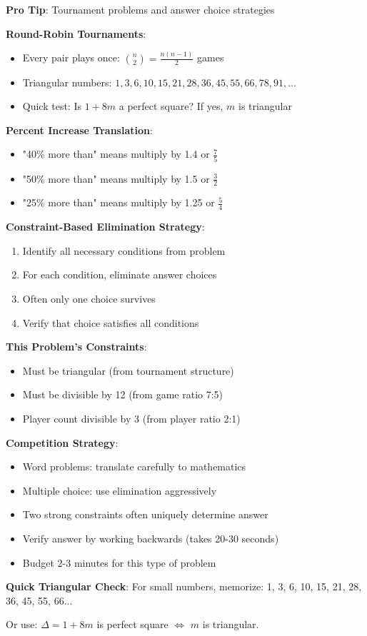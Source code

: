\documentclass[12pt]{article}
\begin{document}
\begin{tipbox}
\textbf{Pro Tip}: Tournament problems and answer choice strategies

\textbf{Round-Robin Tournaments}:
\begin{itemize}
    \item Every pair plays once: $\binom{n}{2} = \frac{n(n-1)}{2}$ games
    \item Triangular numbers: $1, 3, 6, 10, 15, 21, 28, 36, 45, 55, 66, 78, 91, \ldots$
    \item Quick test: Is $1+8m$ a perfect square? If yes, $m$ is triangular
\end{itemize}

\textbf{Percent Increase Translation}:
\begin{itemize}
    \item "40\% more than" means multiply by 1.4 or $\frac{7}{5}$
    \item "50\% more than" means multiply by 1.5 or $\frac{3}{2}$
    \item "25\% more than" means multiply by 1.25 or $\frac{5}{4}$
\end{itemize}

\textbf{Constraint-Based Elimination Strategy}:
\begin{enumerate}
    \item Identify all necessary conditions from problem
    \item For each condition, eliminate answer choices
    \item Often only one choice survives
    \item Verify that choice satisfies all conditions
\end{enumerate}

\textbf{This Problem's Constraints}:
\begin{itemize}
    \item Must be triangular (from tournament structure)
    \item Must be divisible by 12 (from game ratio 7:5)
    \item Player count divisible by 3 (from player ratio 2:1)
\end{itemize}

\textbf{Competition Strategy}:
\begin{itemize}
    \item Word problems: translate carefully to mathematics
    \item Multiple choice: use elimination aggressively
    \item Two strong constraints often uniquely determine answer
    \item Verify answer by working backwards (takes 20-30 seconds)
    \item Budget 2-3 minutes for this type of problem
\end{itemize}

\textbf{Quick Triangular Check}:
For small numbers, memorize: 1, 3, 6, 10, 15, 21, 28, 36, 45, 55, 66...

Or use: $\Delta = 1 + 8m$ is perfect square $\Leftrightarrow$ $m$ is triangular.
\end{tipbox}
\end{document}
